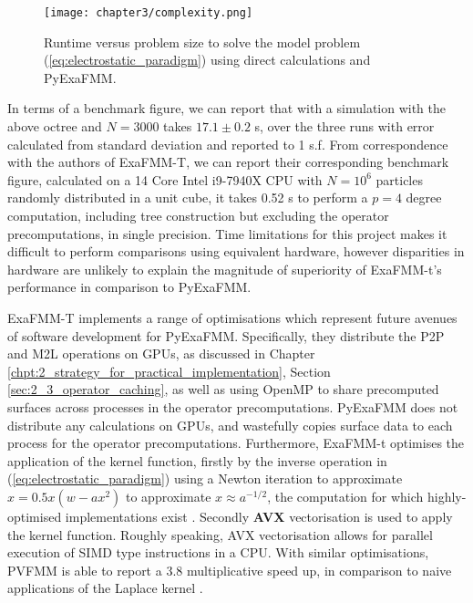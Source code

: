 \begin{figure}[ht]
    \centering

  {\texttt{[image: chapter3/complexity.png]}}
  \vspace{0pt}
    \caption{
        Runtime versus problem size to solve the model problem
        (\ref{eq:electrostatic_paradigm}) using direct calculations and
        \gls{PyExaFMM}.
    }
    \label{fig:3_1_complexity}
\end{figure}

In terms of a benchmark figure, we can report that with a simulation with
the above octree and $N=3000$ takes $17.1 \pm 0.2$ s, over the three runs with
error calculated from standard deviation and reported to 1 s.f. From correspondence
with the authors of ExaFMM-T, we can report their corresponding benchmark figure,
calculated on a 14 Core Intel i9-7940X \gls{CPU} with $N=10^6$ particles
randomly distributed in a unit cube, it takes 0.52 s to perform a $p=4$ degree
computation, including tree construction but excluding the
operator precomputations, in single precision. Time limitations for this project
makes it difficult to perform comparisons using equivalent hardware, however
disparities in hardware are unlikely to explain the magnitude of superiority
of ExaFMM-t's performance in comparison to \gls{PyExaFMM}.

ExaFMM-T implements a range of optimisations which represent future avenues
of software development for \gls{PyExaFMM}. Specifically, they distribute the
\gls{P2P} and \gls{M2L} operations on \gls{GPU}s, as discussed in Chapter
\ref{chpt:2_strategy_for_practical_implementation},
Section \ref{sec:2_3_operator_caching}, as well as using \gls{OpenMP} to share
precomputed surfaces across processes in the operator precomputations.
\gls{PyExaFMM} does not distribute any calculations on \gls{GPU}s, and
wastefully copies surface data to each process for the operator precomputations.
Furthermore, ExaFMM-t optimises the application of the kernel function,
firstly by the inverse operation in (\ref{eq:electrostatic_paradigm}) using a Newton
iteration to approximate $x = 0.5x(w-ax^2)$ to approximate $x \approx a ^{-1/2}$,
the computation for which highly-optimised implementations exist
\cite{Lomont:2003, sqrt}. Secondly \textbf{\gls{AVX}} vectorisation is used
to apply the kernel function. Roughly speaking, \gls{AVX} vectorisation allows
for parallel execution of \gls{SIMD} type instructions in a \gls{CPU}. With similar
optimisations, PVFMM is able to report a 3.8 multiplicative speed up, in
comparison to naive applications of the Laplace kernel \cite{Malhotra:2015:CCP}.
